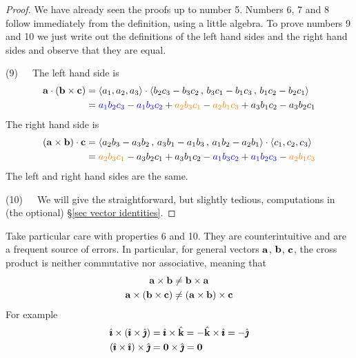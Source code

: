 \begin{proof}
We have already seen the proofs up to number 5. Numbers 6, 7 and 8 
follow immediately from the definition, using a little algebra. To prove 
numbers 9 and 10 we just write out the definitions of the left hand sides 
and the right hand sides and observe that they are equal.

\medskip
\noindent (9)\ \ \ The left hand side is
\begin{align*}
\mathbf{a}\cdot(\mathbf{b}\times\mathbf{c})
&=\left< a_1,a_2,a_3\right>\cdot
      \left< b_2c_3-b_3c_2\,,\, b_3c_1-b_1c_3\,,\, b_1c_2-b_2c_1\right>\\
&=\textcolor{blue}{a_1b_2c_3} - \textcolor{blue}{a_1b_3c_2} 
    + \textcolor{orange}{a_2b_3c_1} - \textcolor{orange}{a_2b_1c_3} 
    + a_3b_1c_2 - a_3b_2c_1
\end{align*}
The right hand side is
\begin{align*}
(\mathbf{a}\times\mathbf{b})\cdot\mathbf{c}
&=\left< a_2b_3-a_3b_2\,,\, a_3b_1-a_1b_3\,,\, a_1b_2-a_2b_1\right>\cdot
       \left< c_1,c_2,c_3\right> \\
&=\textcolor{orange}{a_2b_3c_1} - a_3b_2c_1 + a_3b_1c_2 
- \textcolor{blue}{a_1b_3c_2} + \textcolor{blue}{a_1b_2c_3} 
- \textcolor{orange}{a_2b_1c_3}
\end{align*}
The left and right hand sides are the same.

\medskip
\noindent (10)\ \ \ We will give the straightforward, but slightly tedious,
computations in (the optional) \S\ref{sec vector identities}.
 \end{proof}


\begin{warning}\label{warning:GEOMcross} 
Take particular care with properties 6 and 10. They are 
counterintuitive and are a frequent source of errors. In particular, 
for general vectors $\mathbf{a}$, $\mathbf{b}$, $\mathbf{c}$, the cross product is neither
commutative nor associative, meaning that
\begin{align*}
\mathbf{a}\times\mathbf{b}&\ne\mathbf{b}\times\mathbf{a}\\
\mathbf{a}\times(\mathbf{b}\times\mathbf{c})&\ne (\mathbf{a}\times\mathbf{b})\times\mathbf{c}
\end{align*} 
For example
\begin{align*}
\hat{\pmb{\imath}}\times(\hat{\pmb{\imath}}\times\hat{\pmb{\jmath}})
&=\hat{\pmb{\imath}}\times\hat{\mathbf{k}}=-\hat{\mathbf{k}}\times\hat{\pmb{\imath}} =-\hat{\pmb{\jmath}}\\
(\hat{\pmb{\imath}}\times \hat{\pmb{\imath}})\times\hat{\pmb{\jmath}}&= \mathbf{0} \times\hat{\pmb{\jmath}}=\mathbf{0}\\
\end{align*} 
\end{warning}

